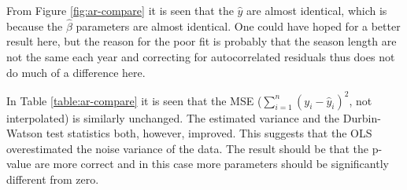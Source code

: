 From Figure \ref{fig:ar-compare} it is seen that the $\hat{y}$ are almost identical, which is because the $\hat{\beta}$ parameters are almost identical. One could have hoped for a better result here, but the reason for the poor fit is probably that the season length are not the same each year and correcting for autocorrelated residuals thus does not do much of a difference here.

In Table \ref{table:ar-compare} it is seen that the MSE ($\sum_{i=1}^n (y_i - \hat{y}_i)^2$, not interpolated) is similarly unchanged. The estimated variance and the Durbin-Watson test statistics both, however, improved. This suggests that the OLS overestimated the noise variance of the data. The result should be that the p-value are more correct and in this case more parameters should be significantly different from zero.
